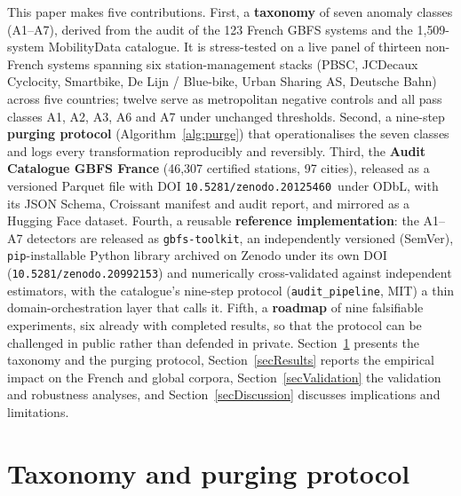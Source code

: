 \documentclass[11pt,a4paper]{article}
\newif\ifanonymous
\newcommand{\zdoi}{\ifanonymous\texttt{[deposited on Zenodo; DOI withheld for review]}\else\texttt{10.5281/zenodo.20125460}\fi}
\newcommand{\toolkitdoi}{\ifanonymous\texttt{[reference-implementation library archived on Zenodo; DOI withheld for review]}\else\texttt{10.5281/zenodo.20992153}\fi}
\begin{document}
This paper makes five contributions. First, a \textbf{taxonomy} of seven
anomaly classes (A1--A7), derived from the audit of the 123 French GBFS
systems and the 1{,}509-system MobilityData catalogue. It is stress-tested
on a live panel of thirteen non-French systems spanning six
station-management stacks (PBSC, JCDecaux Cyclocity, Smartbike, De Lijn /
Blue-bike, Urban Sharing AS, Deutsche Bahn) across five countries; twelve
serve as metropolitan negative controls and all pass classes A1, A2, A3,
A6 and A7 under unchanged thresholds. Second, a nine-step \textbf{purging
protocol} (Algorithm~\ref{alg:purge}) that operationalises the seven
classes and logs every transformation reproducibly and reversibly. Third,
the \textbf{Audit Catalogue GBFS France} (46{,}307 certified stations,
97 cities), released as a versioned Parquet file with DOI
\zdoi\ under ODbL, with its JSON Schema,
Croissant manifest and audit report, and mirrored as a Hugging Face
dataset. Fourth, a reusable \textbf{reference implementation}: the A1--A7
detectors are released as \texttt{gbfs-toolkit}, an independently
versioned (SemVer), \texttt{pip}-installable Python library archived on
Zenodo under its own DOI (\toolkitdoi) and numerically cross-validated
against independent estimators, with the catalogue's nine-step protocol
(\texttt{audit\_pipeline}, MIT) a thin domain-orchestration layer that
calls it. Fifth, a
\textbf{roadmap} of nine falsifiable
experiments, six already with completed results, so that the protocol can
be challenged in public rather than defended in private.
Section~\ref{secTaxProtocol} presents the taxonomy and the purging
protocol, Section~\ref{secResults} reports the empirical impact on the
French and global corpora, Section~\ref{secValidation} the validation and
robustness analyses, and Section~\ref{secDiscussion} discusses
implications and limitations.


\section{Taxonomy and purging protocol}\label{secTaxProtocol}
\end{document}
